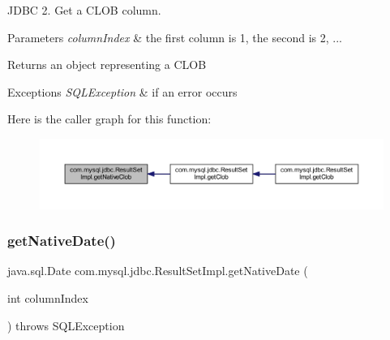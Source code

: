 J\+D\+BC 2. Get a C\+L\+OB column.


\begin{DoxyParams}{Parameters}
{\em column\+Index} & the first column is 1, the second is 2, ...\\
\hline
\end{DoxyParams}
\begin{DoxyReturn}{Returns}
an object representing a C\+L\+OB
\end{DoxyReturn}

\begin{DoxyExceptions}{Exceptions}
{\em S\+Q\+L\+Exception} & if an error occurs \\
\hline
\end{DoxyExceptions}
Here is the caller graph for this function\+:
\nopagebreak
\begin{figure}[H]
\begin{center}
\leavevmode
\includegraphics[width=350pt]{classcom_1_1mysql_1_1jdbc_1_1_result_set_impl_af5981a9f77de2cfbdcf0fcb81de84116_icgraph}
\end{center}
\end{figure}
\mbox{\label{classcom_1_1mysql_1_1jdbc_1_1_result_set_impl_a33bd8cbc2dd3679a2e995584de40d936}} 
\subsubsection{\texorpdfstring{get\+Native\+Date()}{getNativeDate()}\hspace{0.1cm}{\footnotesize\ttfamily [1/2]}}
{\footnotesize\ttfamily java.\+sql.\+Date com.\+mysql.\+jdbc.\+Result\+Set\+Impl.\+get\+Native\+Date (\begin{DoxyParamCaption}\item[{int}]{column\+Index }\end{DoxyParamCaption}) throws S\+Q\+L\+Exception\hspace{0.3cm}{\ttfamily [protected]}}

